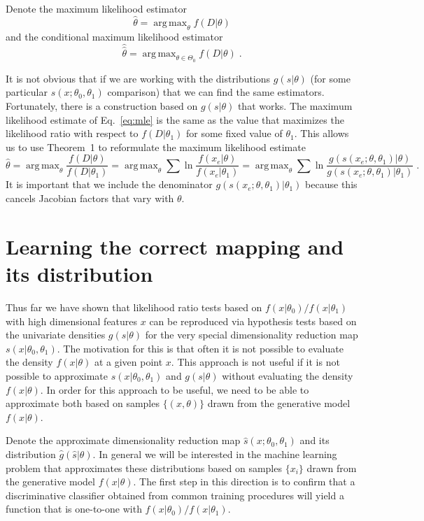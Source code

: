 \documentclass[11pt, oneside]{article}   	%
\DeclareMathOperator*{\argmax}{arg\,max}
\begin{document}
Denote the maximum likelihood estimator
\begin{equation}\label{eq:mle}
\hat{\theta} = \argmax_\theta  f(D | \theta)
\end{equation}
and the conditional maximum likelihood estimator
\begin{equation}
\hat{\hat{\theta}} = \argmax_{\theta \in \Theta_0}  f(D | \theta) \; .
\end{equation}

It is not obvious that if we are working with the distributions $g(s|\theta)$ (for some particular $s(x; \theta_0, \theta_1)$ comparison) that we can find the same estimators. 
Fortunately, there is a construction based on $g(s|\theta)$ that works. The maximum likelihood estimate of Eq.~\ref{eq:mle} is the same as the value that maximizes the likelihood ratio with respect to $f(D|\theta_1)$ for some fixed value of $\theta_1$. This allows us to use Theorem~1 to reformulate the maximum likelihood estimate
\begin{equation}
\hat{\theta} = \argmax_\theta \frac{ f(D | \theta)}{ f(D | \theta_1)} = \argmax_\theta  \sum \ln \frac{f(x_e | \theta)}{f(x_e|\theta_1)} = \argmax_\theta  \sum \ln \frac{g(s(x_e; \theta, \theta_1) | \theta)}{g(s(x_e; \theta, \theta_1) |\theta_1)} \; .
\end{equation}
It is important that we include the denominator $g(s(x_e; \theta, \theta_1) |\theta_1)$ because this cancels Jacobian factors that vary with $\theta$.

\section{Learning the correct mapping and its distribution}\label{S:classifier}

Thus far we have shown that likelihood ratio tests based on $f(x|\theta_0)/f(x|\theta_1)$ with high dimensional features $x$ can be reproduced via hypothesis tests based on the univariate densities $g(s|\theta)$ for the very special dimensionality reduction map $s(x|\theta_0, \theta_1)$. The motivation for this is that often it is not possible to evaluate the density $f(x|\theta)$ at a given point $x$.  This approach is not useful if it is not possible to approximate $s(x|\theta_0, \theta_1)$ and $g(s|\theta)$ without evaluating the density $f(x|\theta)$. In order for this approach to be useful, we need to be able to approximate both based on samples $\{(x,\theta)\}$ drawn from the generative model $f(x|\theta)$.  

Denote the approximate dimensionality reduction map $\hat{s}(x; \theta_0, \theta_1)$ and its distribution $\hat{g}(\hat{s}|\theta)$. In general we will be interested in the machine learning problem that approximates these distributions based on samples $\{x_i\}$ drawn from the generative model $f(x|\theta)$.  
The first step in this direction is to confirm that a discriminative classifier obtained from common training procedures will yield a function that is one-to-one with $f(x|\theta_0)/f(x|\theta_1)$.
\end{document}
